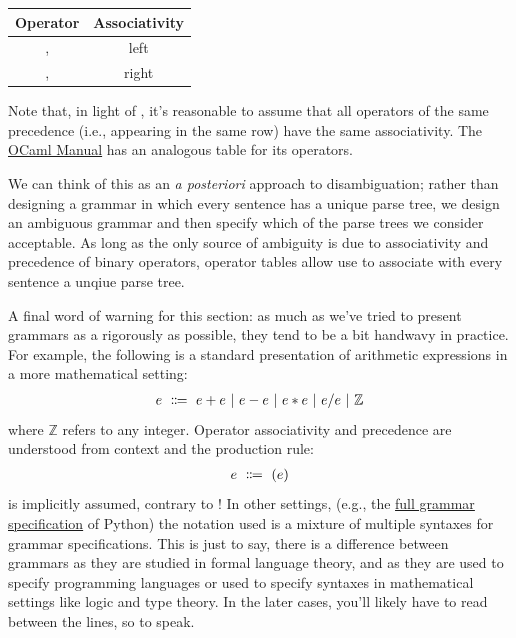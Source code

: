 \begin{center}
  \begin{tabular}{|c|c|}
    \hline
    Operator & Associativity \\
    \hline
    \codel{+}, \codel{-} & left \\
    \codel{*}, \codel{/} & right \\
    \hline
  \end{tabular}
\end{center}
%
Note that, in light of , it's reasonable to assume that all operators of the same precedence (i.e., appearing in the same row) have the same associativity.
The \href{https://ocaml.org/manual/5.3/api/Ocaml_operators.html}{OCaml Manual} has an analogous table for its operators.

\begin{remark}
  We can think of this as an \textit{a posteriori} approach to disambiguation; rather than designing a grammar in which every sentence has a unique parse tree, we design an ambiguous grammar and then specify which of the parse trees we consider acceptable.
  As long as the only source of ambiguity is due to associativity and precedence of binary operators, operator tables allow use to associate with every sentence a unqiue parse tree.
\end{remark}

A final word of warning for this section: as much as we've tried to present grammars as a rigorously as possible, they tend to be a bit handwavy in practice.
For example, the following is a standard presentation of arithmetic expressions in a more mathematical setting:
\begin{align*}
  e \ \Coloneqq \  e + e \ | \  e - e \ | \  e * e \ | \  e / e \ | \  \mathbb Z
\end{align*}
where $\mathbb Z$ refers to any integer.
Operator associativity and precedence are understood from context and the production rule:
\begin{align*}
  e \ \Coloneqq \  ( e )
\end{align*}
is implicitly assumed, contrary to !
In other settings, (e.g., the \href{https://docs.python.org/3/reference/grammar.html}{full grammar specification} of Python) the notation used is a mixture of multiple syntaxes for grammar specifications.
This is just to say, there is a difference between grammars as they are studied in formal language theory, and as they are used to specify programming languages or used to specify syntaxes in mathematical settings like logic and type theory.
In the later cases, you'll likely have to read between the lines, so to speak.

